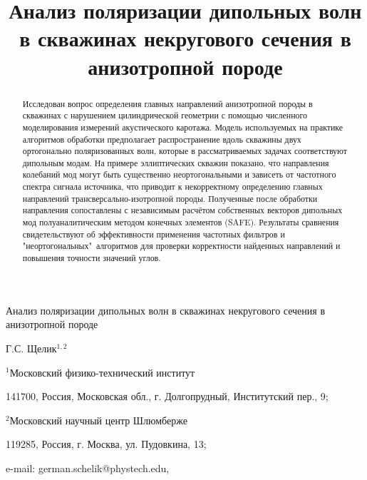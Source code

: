 \documentclass[a4paper,11pt]{article}
\begin{document}
\renewcommand\refname{\bfseries Литература}

{\LARGE \bfseries \par \noindent Анализ поляризации дипольных волн в скважинах некругового сечения в анизотропной породе}
\par\bigskip

{\centering Г.С. Щелик$^{1,2}$ \par}
\medskip
{\centering \footnotesize
	$^1${Московский физико-технический институт} \par
	141700, Россия, Московская обл., г. Долгопрудный, Институтский пер., 9; \par
	$^2${Московский научный центр Шлюмберже} \par
	119285, Россия, г. Москва, ул. Пудовкина, 13; \par
	e-mail: german.schelik@phystech.edu,
	\par}
\par\bigskip

\par

\title{Анализ поляризации дипольных волн в скважинах некругового сечения в анизотропной породе}	
\begin{abstract}

Исследован вопрос определения главных направлений анизотропной породы в скважинах с нарушением цилиндрической геометрии с помощью численного моделирования измерений акустического каротажа. Модель используемых на практике алгоритмов обработки предполагает распространение вдоль скважины двух ортогонально поляризованных волн, которые в рассматриваемых задачах соответствуют дипольным модам. На примере эллиптических скважин показано, что направления колебаний мод могут быть существенно неортогональными и зависеть от частотного спектра сигнала источника, что приводит к некорректному определению главных направлений трансверсально-изотропной породы. Полученные после обработки направления сопоставлены с независимым расчётом собственных векторов дипольных мод полуаналитическим методом конечных элементов (SAFE). Результаты сравнения свидетельствуют об эффективности применения частотных фильтров и "неортогональных"\ алгоритмов для проверки корректности найденных направлений и повышения точности значений углов. %
\end{abstract}
\end{document}
